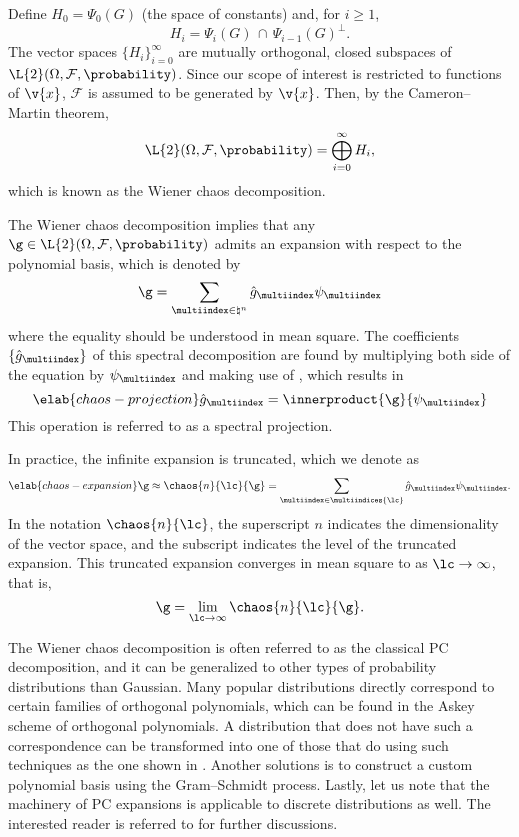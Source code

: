Define $H_0 = \Psi_0(G)$ (the space of constants) and, for $i \geq 1$,
\[
  H_i = \Psi_i(G) \, \cap \, \Psi_{i - 1}(G)^\perp.
\]
The vector spaces $\{ H_i \}_{i = 0}^\infty$ are mutually orthogonal, closed
subspaces of $\L{2}(\Omega, \mathcal{F}, \probability)$. Since our scope of
interest is restricted to functions of $\v{x}$, $\mathcal{F}$ is assumed to be
generated by $\v{x}$. Then, by the Cameron--Martin theorem,
\[
  \L{2}(\Omega, \mathcal{F}, \probability) = \bigoplus_{i = 0}^\infty H_i,
\]
which is known as the Wiener chaos decomposition.

The Wiener chaos decomposition implies that any $\g \in \L{2}(\Omega,
\mathcal{F}, \probability)$ admits an expansion with respect to the polynomial
basis, which is denoted by
\[
  \g = \sum_{\multiindex \in \natural^n} \hat{g}_{\multiindex} \psi_{\multiindex}
\]
where the equality should be understood in mean square. The coefficients $\{
\hat{g}_{\multiindex} \}$ of this spectral decomposition are found by
multiplying both side of the equation by $\psi_{\multiindex}$ and making use of
, which results in
\begin{equation} \elab{chaos-projection}
  \hat{g}_{\multiindex} = \innerproduct{\g}{\psi_{\multiindex}}
\end{equation}
This operation is referred to as a spectral projection.

In practice, the infinite expansion is truncated, which we denote as
\begin{equation} \elab{chaos-expansion}
  \g \approx \chaos{n}{\lc}{\g} = \sum_{\multiindex \in \multiindices{\lc}} \hat{g}_{\multiindex} \psi_{\multiindex}.
\end{equation}
In the notation $\chaos{n}{\lc}$, the superscript $n$ indicates the
dimensionality of the vector space, and the subscript \lc indicates the level of
the truncated expansion. This truncated expansion converges in mean square to \g
as $\lc \to \infty$, that is,
\[
  \g = \lim_{\lc \to \infty} \chaos{n}{\lc}{\g}.
\]

The Wiener chaos decomposition is often referred to as the classical \acf{PC}
decomposition, and it can be generalized to other types of probability
distributions than Gaussian. Many popular distributions directly correspond to
certain families of orthogonal polynomials, which can be found in the Askey
scheme of orthogonal polynomials. A distribution that does not have such a
correspondence can be transformed into one of those that do using such
techniques as the one shown in . Another
solutions is to construct a custom polynomial basis using the Gram--Schmidt
process. Lastly, let us note that the machinery of \ac{PC} expansions is
applicable to discrete distributions as well. The interested reader is referred
to \cite{xiu2010} for further discussions.
